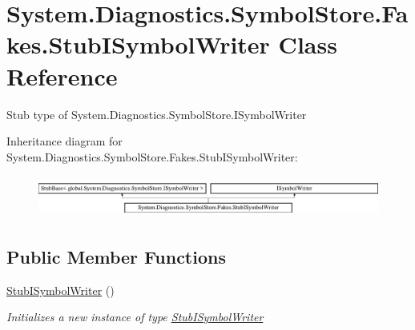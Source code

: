 \hypertarget{class_system_1_1_diagnostics_1_1_symbol_store_1_1_fakes_1_1_stub_i_symbol_writer}{\section{System.\-Diagnostics.\-Symbol\-Store.\-Fakes.\-Stub\-I\-Symbol\-Writer Class Reference}
\label{class_system_1_1_diagnostics_1_1_symbol_store_1_1_fakes_1_1_stub_i_symbol_writer}
}


Stub type of System.\-Diagnostics.\-Symbol\-Store.\-I\-Symbol\-Writer 


Inheritance diagram for System.\-Diagnostics.\-Symbol\-Store.\-Fakes.\-Stub\-I\-Symbol\-Writer\-:\begin{figure}[H]
\begin{center}
\leavevmode
\includegraphics[height=1.396509cm]{class_system_1_1_diagnostics_1_1_symbol_store_1_1_fakes_1_1_stub_i_symbol_writer}
\end{center}
\end{figure}
\subsection*{Public Member Functions}
\begin{DoxyCompactItemize}
\item 
\hyperlink{class_system_1_1_diagnostics_1_1_symbol_store_1_1_fakes_1_1_stub_i_symbol_writer_ae9e00cd8e54348f98da639c558c72680}{Stub\-I\-Symbol\-Writer} ()
\begin{DoxyCompactList}\small\item\em Initializes a new instance of type \hyperlink{class_system_1_1_diagnostics_1_1_symbol_store_1_1_fakes_1_1_stub_i_symbol_writer}{Stub\-I\-Symbol\-Writer}\end{DoxyCompactList}\end{DoxyCompactItemize}
